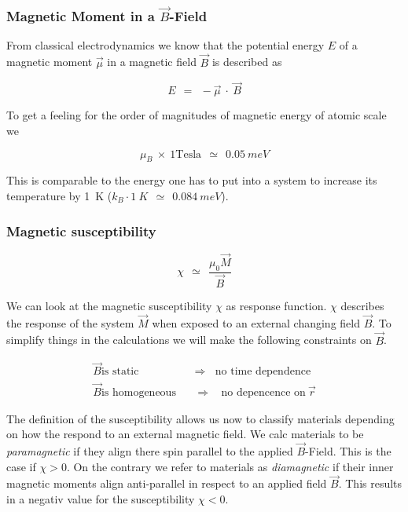 \documentclass[10pt]{report}
\numberwithin{equation}{chapter}
\begin{document}
\subsubsection{Magnetic Moment in a $\vec{B}$-Field}


From classical electrodynamics we know that the potential energy $E$ of a magnetic moment $\vec{\mu}$ in a magnetic field $\vec{B}$ is described as

\begin{equation}
  E ~~=~~ - \vec{\mu} ~\cdot~ \vec{B}
\end{equation}

To get a feeling for the order of magnitudes of magnetic energy of atomic scale we 

\begin{equation*}
  \mu_B ~\times~ 1 \text{Tesla} ~~\simeq~~ \SI{0.05}{meV}
\end{equation*}

This is comparable to the energy one has to put into a system to increase its temperature by \SI[mode=text]{1}{K} ($ k_B \cdot \SI{1}{K} ~~\simeq~~ \SI{0.084}{meV}$).


\subsubsection{Magnetic susceptibility}

\begin{equation} \label{eq:mag_suscept}
  \chi ~~≃~~ \frac{\mu_0 \vec{M}}{\vec{B}}
\end{equation}

We can look at the magnetic susceptibility $\chi$ as response function. $\chi$ describes the response of the system $\vec{M}$ when exposed to an external changing field $\vec{B}$.
To simplify things in the calculations we will make the following constraints on $\vec{B}$.

\begin{align*}
  \vec{B} \text{is static} ~~~~ &  \Rightarrow  ~~~~ \text{no time dependence}\\
  \vec{B} \text{is homogeneous} ~~~~ & \Rightarrow  ~~~~ \text{no depencence on}\ \vec{r}
\end{align*}


The definition of the susceptibility allows us now to classify materials depending on how the respond to an external magnetic field. We calc materials to be \textit{paramagnetic} if they align there spin parallel to the applied $\vec{B}$-Field. This is the case if $\chi > 0$. On the contrary we refer to materials as \textit{diamagnetic} if their inner magnetic moments align anti-parallel in respect to an applied field $\vec{B}$. This results in a negativ value for the susceptibility $\chi < 0$.
\end{document}
